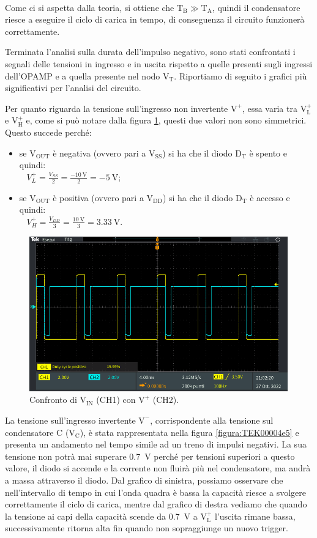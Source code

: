 \documentclass{report}
\begin{document}
\\[4pt]Come ci si aspetta dalla teoria, si ottiene che $\mathrm{T_B}\gg\mathrm{T_A}$, quindi il condensatore riesce a eseguire il ciclo di carica in tempo, di conseguenza il circuito funzionerà correttamente.\par
Terminata l'analisi sulla durata dell'impulso negativo, sono stati confrontati i segnali delle tensioni in ingresso e in uscita rispetto a quelle presenti sugli ingressi dell'OPAMP e a quella presente nel nodo $\mathrm{V_T}$. Riportiamo di seguito i grafici più significativi per l'analisi del circuito.\par
Per quanto riguarda la tensione sull'ingresso non invertente $\mathrm{V^+}$, essa varia tra $\mathrm{V_L^+}$ e $\mathrm{V_H^+}$ e, come si può notare dalla figura \ref{figura:TEK00003}, questi due valori non sono simmetrici. Questo succede perché:
\begin{itemize}
	\item se $\mathrm{V_{OUT}}$ è negativa (ovvero pari a $\mathrm{V_{SS}}$) si ha che il diodo $\mathrm{D_T}$ è spento e quindi:
	\\[4pt]$\displaystyle{\;\;\;V_L^+=\frac{V_{SS}}{2}=\frac{\SI{-10}{\volt}}{2}=\SI{-5}{\volt}}$;
	\item se $\mathrm{V_{OUT}}$ è positiva (ovvero pari a $\mathrm{V_{DD}}$) si ha che il diodo $\mathrm{D_T}$ è accesso e quindi:
	\\[4pt]$\displaystyle{\;\;\;V_H^+=\frac{V_{DD}}{3}=\frac{\SI{10}{\volt}}{3}=\SI{3.33}{\volt}}$.
\end{itemize}
\begin{figure}[h!]
	\centering
	\includegraphics[height=6.7cm]{immagini/TEK00003}
	\caption{Confronto di $\mathrm{V_{IN}}$ (CH1) con $\mathrm{V^+}$ (CH2).}
	\label{figura:TEK00003}
\end{figure}
La tensione sull'ingresso invertente $\mathrm{V^-}$, corrispondente alla tensione sul condensatore C ($\mathrm{V_C}$), è stata rappresentata nella figura \ref{figura:TEK00004e5} e presenta un andamento nel tempo simile ad un treno di impulsi negativi. La sua tensione non potrà mai superare \SI{0.7}{\volt} perché per tensioni superiori a questo valore, il diodo si accende e la corrente non fluirà più nel condensatore, ma andrà a massa attraverso il diodo. Dal grafico di sinistra, possiamo osservare che nell'intervallo di tempo in cui l'onda quadra è bassa la capacità riesce a svolgere correttamente il ciclo di carica, mentre dal grafico di destra vediamo che quando la tensione ai capi della capacità scende da \SI{0.7}{\volt} a $\mathrm{V_L^+}$ l'uscita rimane bassa, successivamente ritorna alta fin quando non sopraggiunge un nuovo trigger.
\end{document}

